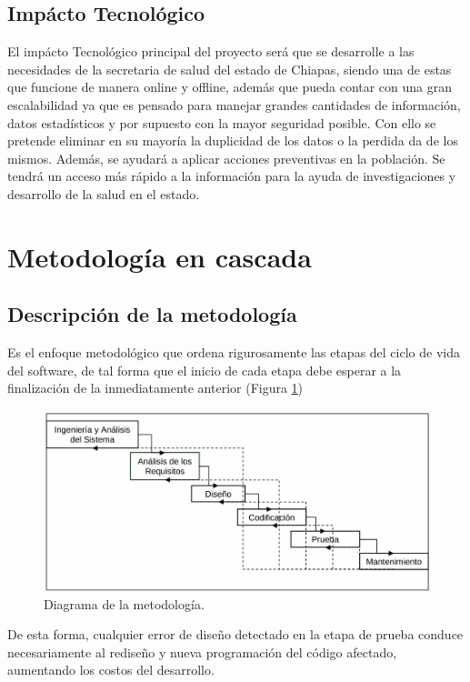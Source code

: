 \subsection{Impácto Tecnológico}
El impácto Tecnológico principal del proyecto será que se desarrolle a las necesidades de la secretaria de salud del estado de Chiapas, siendo una de estas que funcione de manera online y offline, además que pueda contar con una gran escalabilidad ya que es pensado para manejar grandes cantidades de información, datos estadísticos y por supuesto con la mayor seguridad posible.  Con ello se pretende eliminar en su mayoría la duplicidad de los datos o la perdida da de los mismos. Además, se ayudará a aplicar acciones preventivas en la población. Se tendrá un acceso más rápido a la información para la ayuda de investigaciones y desarrollo de la salud en el estado.

\section{Metodología en cascada}
    \subsection{Descripción de la metodología}
      Es el enfoque metodológico que ordena rigurosamente las etapas del ciclo de vida
      del software, de tal forma que el inicio de cada etapa debe esperar a la finalización
      de la inmediatamente anterior (Figura \ref{metodologia})

      \begin{figure}[h]
        \centering
        \includegraphics[scale=.3]{lib/assets/diagramaMetodologia}
        \caption{Diagrama de la metodología.}
        \label{metodologia}
      \end{figure}


De esta forma, cualquier error de diseño detectado en la etapa de prueba conduce
necesariamente al rediseño y nueva programación del código afectado, aumentando
los costos del desarrollo.


